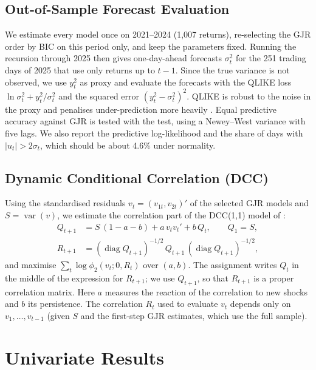 \documentclass[10pt,a4paper]{article}
\begin{document}
\subsection{Out-of-Sample Forecast Evaluation}
We estimate every model once on 2021--2024 (1,007 returns), re-selecting the GJR order by BIC on this
period only, and keep the parameters fixed. Running the recursion through 2025 then gives one-day-ahead
forecasts $\sigma^2_t$ for the 251 trading days of 2025 that use only returns up to $t-1$. Since the true
variance is not observed, we use $y_t^2$ as proxy and evaluate the forecasts with the QLIKE loss
$\ln\sigma_t^2 + y_t^2/\sigma_t^2$ and the squared error $(y_t^2-\sigma_t^2)^2$. QLIKE is robust to the
noise in the proxy and penalises under-prediction more heavily \citep{patton2011}. Equal predictive accuracy
against GJR is tested with the \citet{diebold1995} test, using a Newey--West variance with five lags. We
also report the predictive log-likelihood and the share of days with $|u_t|>2\sigma_t$, which should be
about 4.6\% under normality.

\subsection{Dynamic Conditional Correlation (DCC)}
Using the standardised residuals $v_t=(v_{1t},v_{2t})'$ of the selected GJR models and
$S = \operatorname{var}(v)$, we estimate the correlation part of the DCC(1,1) model of
\citet{engle2002}:
\begin{align}
    Q_{t+1} &= S\,(1 - a - b) + a\, v_t v_t' + b\, Q_t , \qquad Q_1 = S,\\
    R_{t+1} &= (\operatorname{diag} Q_{t+1})^{-1/2}\, Q_{t+1}\, (\operatorname{diag} Q_{t+1})^{-1/2},
\end{align}
and maximise $\sum_t \log\phi_2(v_t; 0, R_t)$ over $(a,b)$. The assignment writes $Q_t$ in the middle of
the expression for $R_{t+1}$; we use $Q_{t+1}$, so that $R_{t+1}$ is a proper correlation matrix. Here $a$ measures the reaction of the
correlation to new shocks and $b$ its persistence. The correlation $R_t$ used to evaluate $v_t$ depends
only on $v_1,\dots,v_{t-1}$ (given $S$ and the first-step GJR estimates, which use the full sample).

\section{Univariate Results}\label{sec:results}
\end{document}
